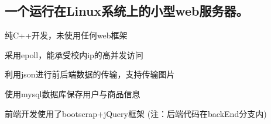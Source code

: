 \subsection*{一个运行在\+Linux系统上的小型web服务器。}


\begin{DoxyItemize}
\item 纯\+C++开发，未使用任何web框架
\item 采用epoll，能承受校内ip的高并发访问
\item 利用json进行前后端数据的传输，支持传输图片
\item 使用mysql数据库保存用户与商品信息
\item 前端开发使用了bootscrap+j\+Query框架 (注：后端代码在back\+End分支内) 
\end{DoxyItemize}